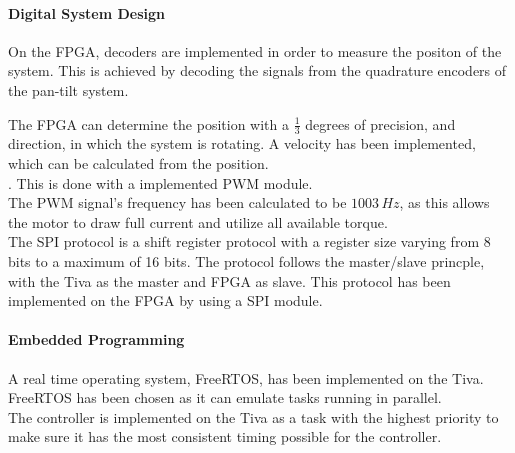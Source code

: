\documentclass[../../main]{subfiles}
\begin{document}
\paragraph{Digital System Design}
On the FPGA, decoders are implemented in order to measure the positon of the system.
This is achieved by decoding the signals from the quadrature encoders of the pan-tilt system.

The FPGA can determine the position with a  $\frac{1}{3}$ degrees of precision, and direction, in which the system is rotating.
A velocity has been implemented, which can be calculated from the position.\\

. This is done with a implemented PWM module.\\
The PWM signal's frequency has been calculated to be $1003 \si{\,Hz}$, as this allows the motor to draw full current and utilize all available torque. \\
The SPI protocol is a shift register protocol with a register size varying from 8 bits to a maximum of 16 bits. The protocol follows the master/slave princple, with the Tiva as the master and FPGA as slave. This protocol has been implemented on the FPGA by using a SPI module.

\paragraph{Embedded Programming}
A real time operating system, FreeRTOS, has been implemented on the Tiva. FreeRTOS has been chosen as it can emulate tasks running in parallel. \\
The controller is implemented on the Tiva as a task with the highest priority to make sure it has the most consistent timing possible for the controller.
\end{document}
